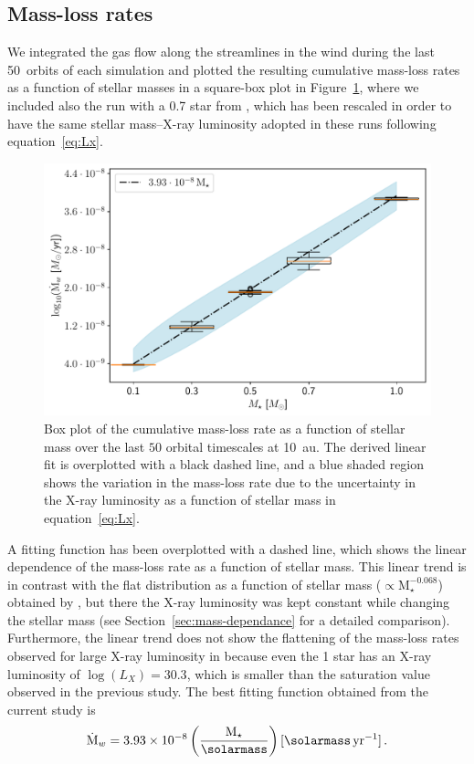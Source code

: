 \documentclass[usenatbib,useAMS,usedcolumn]{mnras}
\begin{document}
\subsection{Mass-loss rates}\label{sec:mdot}
We integrated the gas flow along the streamlines in the wind during the last \SI{50}{orbits} of each simulation and plotted the resulting cumulative mass-loss rates as a function of stellar masses in a square-box plot in Figure~\ref{fig:Mdot}, where we included also the run with a \SI{0.7}{\solarmass} star from , which has been rescaled in order to have the same stellar mass--X-ray luminosity adopted in these runs following equation~\ref{eq:Lx}.
\begin{figure}
  \includegraphics[width=\columnwidth]{Figure6}
  \caption{Box plot of the cumulative mass-loss rate as a function of stellar mass over the last $50$ orbital timescales at \SI{10}{\astronomicalunit}. The derived linear fit is overplotted with a black dashed line, and a blue shaded region shows the variation in the mass-loss rate due to the uncertainty in the X-ray luminosity as a function of stellar mass in equation~\ref{eq:Lx}. \label{fig:Mdot}}
\end{figure}
A fitting function has been overplotted with a dashed line, which shows the linear dependence of the mass-loss rate as a function of stellar mass. This linear trend is in contrast with the flat distribution as a function of stellar mass ($\propto \mathrm{M}_\star^{-0.068}$) obtained by , but there the X-ray luminosity was kept constant while changing the stellar mass (see Section~\ref{sec:mass-dependance} for a detailed comparison). Furthermore, the linear trend does not show the flattening of the mass-loss rates observed for large X-ray luminosity in  because even the \SI{1}{\solarmass} star has an X-ray luminosity of $\log(L_X) = 30.3$, which is smaller than the saturation value observed in the previous study.
The best fitting function obtained from the current study is
\begin{equation}\label{eq:MdotLxMass}
  \dot{\mathrm{M}}_w = 3.93\times10^{-8} \left(\frac{\mathrm{M}_\star}{\si{\solarmass}}\right) [\si{\solarmass.yr^{-1}}]\,.
\end{equation}
\end{document}
